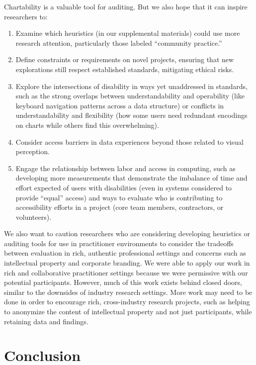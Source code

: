 \documentclass[12pt]{cmuthesis}
\begin{document}
Chartability is a valuable tool for auditing. But we also hope that it can inspire researchers to:
\begin{enumerate}
    \item Examine which heuristics (in our supplemental materials) could use more research attention, particularly those labeled ``community practice.''
    \item Define constraints or requirements on novel projects, ensuring that new explorations still respect established standards, mitigating ethical risks.
    \item Explore the intersections of disability in ways yet unaddressed in standards, such as the strong overlaps between understandability and operability (like keyboard navigation patterns across a data structure) or conflicts in understandability and flexibility (how some users need redundant encodings on charts while others find this overwhelming).
    \item Consider access barriers in data experiences beyond those related to visual perception.
    \item Engage the relationship between labor and access in computing, such as developing more measurements that demonstrate the imbalance of time and effort expected of users with disabilities (even in systems considered to provide ``equal'' access) and ways to evaluate who is contributing to accessibility efforts in a project (core team members, contractors, or volunteers).
\end{enumerate}

We also want to caution researchers who are considering developing heuristics or auditing tools for use in practitioner environments to consider the tradeoffs between evaluation in rich, authentic professional settings and concerns such as intellectual property and corporate branding. We were able to apply our work in rich and collaborative practitioner settings because we were permissive with our potential participants. However, much of this work exists behind closed doors, similar to the downsides of industry research settings. More work may need to be done in order to encourage rich, cross-industry research projects, such as helping to anonymize the content of intellectual property and not just participants, while retaining data and findings. 

\section{Conclusion}
\end{document}
